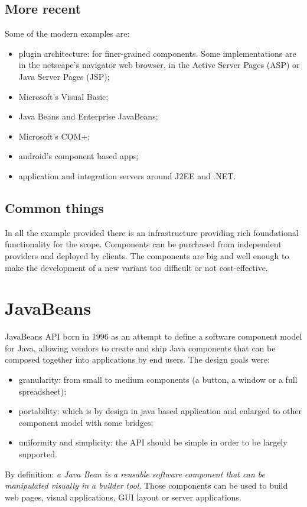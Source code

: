 \subsection{More recent}
Some of the modern examples are:
\begin{itemize}
    \item plugin architecture: for finer-grained components.
    Some implementations are in the netscape's navigator web browser, in the Active Server Pages (ASP) or Java Server Pages (JSP);
    \item Microsoft's Visual Basic;
    \item Java Beans and Enterprise JavaBeans;
    \item Microsoft's COM+;
    \item android's component based apps;
    \item application and integration servers around J2EE and .NET.
\end{itemize}

\subsection{Common things}
In all the example provided there is an infrastructure providing rich foundational functionality for the scope.
Components can be purchased from independent providers and deployed by clients.
The components are big and well enough to make the development of a new variant too difficult or not cost-effective.

\section{JavaBeans}
JavaBeans API born in 1996 as an attempt to define a software component model for Java, allowing vendors to create and ship Java components that can be composed together into applications by end users.
The design goals were:
\begin{itemize}
    \item granularity: from small to medium components (a button, a window or a full spreadsheet);
    \item portability: which is by design in java based application and enlarged to other component model with some bridges;
    \item uniformity and simplicity: the API should be simple in order to be largely supported.
\end{itemize}

By definition: \emph{a Java Bean is a reusable software component that can be manipulated visually in a builder tool}.
Those components can be used to build web pages, visual applications, GUI layout or server applications.

